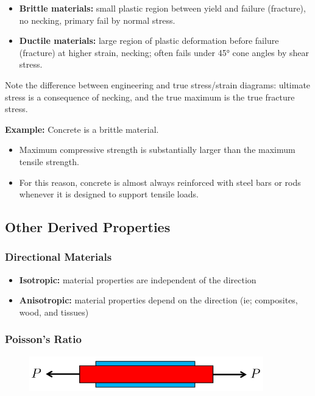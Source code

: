 \begin{itemize}
    \item \textbf{Brittle materials:} small plastic region between yield and failure (fracture), no necking, primary fail by normal stress.
    \item \textbf{Ductile materials:} large region of plastic deformation before failure (fracture) at higher strain, necking; often fails under 45° cone angles by shear stress.
\end{itemize}

\noindent Note the difference between engineering and true stress/strain diagrams: ultimate stress is a consequence of necking, and the true maximum is the true fracture stress.

\vspace{3mm}
\noindent \textbf{Example:} Concrete is a brittle material.

\begin{itemize}
    \item Maximum compressive strength is substantially larger than the maximum tensile strength.
    \item For this reason, concrete is almost always reinforced with steel bars or rods whenever it is designed to support tensile loads.
\end{itemize}

\subsection{Other Derived Properties}

\subsubsection{Directional Materials}
\begin{itemize}
    \item \textbf{Isotropic:} material properties are independent of the direction
    \item \textbf{Anisotropic:} material properties depend on the direction (ie; composites, wood, and tissues)
\end{itemize}

\subsubsection{Poisson's Ratio}
\begin{figure}[!h]
\centering
\includegraphics[angle=0, width=4in]{Material Properties-Figures/Poisson's Ratio.png}
\vspace{-2mm}
\caption{\small {}}
\vspace{-3mm}
\label{Fig:PoissonsRatio}
\end{figure}

